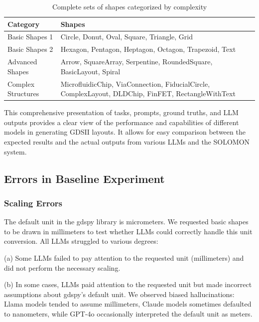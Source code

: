 \documentclass{article}
\begin{document}
\begin{table}[h]
\centering
\begin{tabular}{|l|l|}
\hline
\textbf{Category} & \textbf{Shapes} \\
\hline
Basic Shapes 1 & Circle, Donut, Oval, Square, Triangle, Grid \\
\hline
Basic Shapes 2 & Hexagon, Pentagon, Heptagon, Octagon, Trapezoid, Text \\
\hline
Advanced Shapes & Arrow, SquareArray, Serpentine, RoundedSquare, BasicLayout, Spiral \\
\hline
Complex Structures & MicrofluidicChip, ViaConnection, FiducialCircle, ComplexLayout, DLDChip, FinFET, RectangleWithText \\
\hline
\end{tabular}
\caption{Complete sets of shapes categorized by complexity}
\label{tab:shape_categories}
\end{table}

This comprehensive presentation of tasks, prompts, ground truths, and LLM outputs provides a clear view of the performance and capabilities of different models in generating GDSII layouts. It allows for easy comparison between the expected results and the actual outputs from various LLMs and the SOLOMON system.

\subsection{Errors in Baseline Experiment}
\label{appendix:baseline_errors}

\subsubsection{Scaling Errors}
\label{appendix:scaling_errors}

The default unit in the gdspy library is micrometers. We requested basic shapes to be drawn in millimeters to test whether LLMs could correctly handle this unit conversion. All LLMs struggled to various degrees:

(a) Some LLMs failed to pay attention to the requested unit (millimeters) and did not perform the necessary scaling.

(b) In some cases, LLMs paid attention to the requested unit but made incorrect assumptions about gdspy's default unit. We observed biased hallucinations: Llama models tended to assume millimeters, Claude models sometimes defaulted to nanometers, while GPT-4o occasionally interpreted the default unit as meters.
\end{document}
